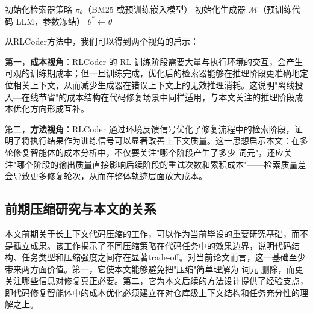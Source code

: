 \begin{algorithm}[H]
\caption{RLCoder: 强化学习驱动的检索增强代码生成训练}
\label{alg:rlcoder}
初始化检索器策略 $\pi_\theta$（BM25 或预训练嵌入模型）\;
初始化生成器 $\mathcal{M}$（预训练代码 LLM，参数冻结）\;
\Return $\theta^* \leftarrow \theta$\;
\end{algorithm}

从RLCoder方法中，我们可以得到两个视角的启示：

第一，\textbf{成本视角}：RLCoder 的 RL 训练阶段需要大量与执行环境的交互，会产生可观的训练期成本；但一旦训练完成，优化后的检索器能够在推理阶段更准确地定位相关上下文，从而减少生成器在错误上下文上的无效推理消耗。这说明"离线投入—在线节省"的成本结构在代码修复场景中同样适用，与本文关注的推理阶段成本优化方向形成互补。

第二，\textbf{方法视角}：RLCoder 通过环境反馈信号优化了修复流程中的检索阶段，证明了将执行结果作为训练信号可以显著改善上下文质量。这一思想启示本文：在多轮修复智能体的成本分析中，不仅要关注"哪个阶段产生了多少 词元"，还应关注"哪个阶段的输出质量直接影响后续阶段的重试次数和累积成本"——检索质量差会导致更多修复轮次，从而在整体轨迹层面放大成本。


\subsection{前期压缩研究与本文的关系}

本文前期关于长上下文代码压缩的工作，可以作为当前毕设的重要研究基础，而不是孤立成果。该工作揭示了不同压缩策略在代码任务中的效果边界，说明代码结构、任务类型和压缩强度之间存在显著trade-off。对当前论文而言，这一基础至少带来两方面价值。第一，它使本文能够避免把"压缩"简单理解为 词元 删除，而更关注哪些信息对修复真正必要。第二，它为本文后续的方法设计提供了经验支点，即代码修复智能体中的成本优化必须建立在对仓库级上下文结构和任务充分性的理解之上。

